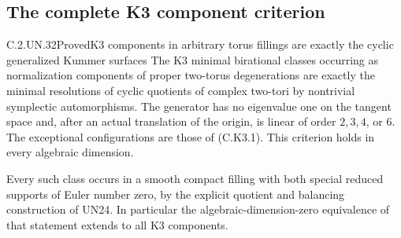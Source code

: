 \subsection{The complete K3 component criterion}

\begin{statement}{C.2.UN.32}{Proved}{K3 components in arbitrary torus fillings are exactly the cyclic generalized Kummer surfaces}
The K3 minimal birational classes occurring as
normalization components of proper two-torus
degenerations are exactly the minimal resolutions
of cyclic quotients of complex two-tori by
nontrivial symplectic automorphisms.
The generator has no eigenvalue one on the tangent space
and, after an actual translation of the origin,
is linear of order $2,3,4$, or $6$.
The exceptional configurations are those of
(C.K3.1). This criterion holds in every
algebraic dimension.

Every such class occurs in a smooth compact
filling with both special reduced supports
of Euler number zero, by the explicit quotient
and balancing construction of UN24.
In particular the algebraic-dimension-zero
equivalence of that statement extends to
all K3 components.
\end{statement}
